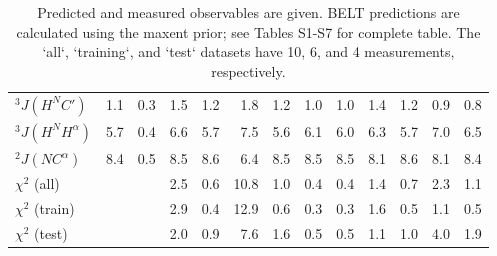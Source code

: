 \documentclass[12pt]{article}
\begin{document}
\begin{table}
\begin{tabular}{lrrrrrrrrrrrr}
$^3J(H^NC\prime)$ &  1.1 &          0.3 &      1.5 &             1.2 &      1.8 &             1.2 &                1.0 &                       1.0 &       1.4 &              1.2 &     0.9 &            0.8 \\
$^3J(H^NH^\alpha)$     &  5.7 &          0.4 &      6.6 &             5.7 &      7.5 &             5.6 &                6.1 &                       6.0 &       6.3 &              5.7 &     7.0 &            6.5 \\
$^2J(NC^\alpha)$      &  8.4 &          0.5 &      8.5 &             8.6 &      6.4 &             8.5 &                8.5 &                       8.5 &       8.1 &              8.6 &     8.1 &            8.4 \\
$\chi^2$ (all)                           &    &            &      2.5 &             0.6 &     10.8 &             1.0 &                0.4 &                       0.4 &       1.4 &              0.7 &     2.3 &            1.1 \\
$\chi^2$ (train)                         &    &            &      2.9 &             0.4 &     12.9 &             0.6 &                0.3 &                       0.3 &       1.6 &              0.5 &     1.1 &            0.5 \\
$\chi^2$ (test)                          &    &            &      2.0 &             0.9 &      7.6 &             1.6 &                0.5 &                       0.5 &       1.1 &              1.0 &     4.0 &            1.9 \\
\bottomrule
\end{tabular}
\caption{
Predicted and measured observables are given.  BELT predictions are calculated using the maxent prior; see Tables S1-S7 for complete table.  The `all`, `training`, and `test` datasets have 10, 6, and 4 measurements, respectively.  
}
\label{table:Predictions}
\end{table}

\clearpage




\clearpage




\end{document}
